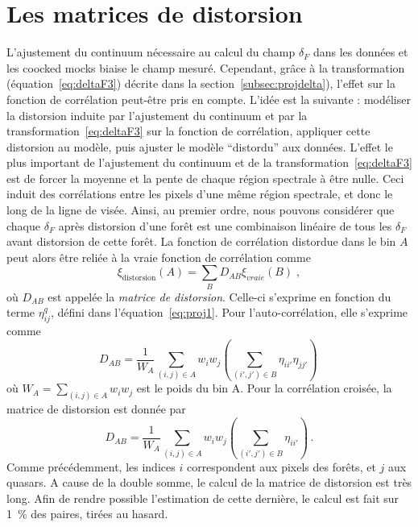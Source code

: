 \section{Les matrices de distorsion}
\label{sec:calcul_dmat}
L'ajustement du continuum nécessaire au calcul du champ $\delta_F$ dans les données et les coocked mocks biaise le champ mesuré. Cependant, grâce à la transformation (équation~\ref{eq:deltaF3}) décrite dans la section~\ref{subsec:projdelta}), l'effet sur la fonction de corrélation peut-être pris en compte.
L'idée est la suivante : modéliser la distorsion induite par l'ajustement du continuum et par la transformation~\ref{eq:deltaF3} sur la fonction de corrélation, appliquer cette distorsion au modèle, puis ajuster le modèle ``distordu'' aux données.
L'effet le plus important de l'ajustement du continuum et de la transformation~\ref{eq:deltaF3} est de forcer la moyenne et la pente de chaque région spectrale à être nulle. Ceci induit des corrélations entre les pixels d'une même région spectrale, et donc le long de la ligne de visée.
Ainsi, au premier ordre, nous pouvons considérer que chaque $\delta_F$ après distorsion d'une forêt est une combinaison linéaire de tous les $\delta_F$ avant distorsion de cette forêt.
La fonction de corrélation distordue dans le bin $A$ peut alors être reliée à la vraie fonction de corrélation comme
\begin{equation}
  \xi_{\mathrm{distorsion}}(A) = \sum_{B} D_{AB}\xi_{vraie}(B) \; , 
\end{equation}
où $D_{AB}$ est appelée la \emph{matrice de distorsion}. Celle-ci s'exprime en fonction du terme $\eta_{ij}^q$, défini dans l'équation~\ref{eq:proj1}. Pour l'auto-corrélation, elle s'exprime comme
\begin{equation}
  \label{eq:dmat}
  D_{AB} = \frac{1}{W_A} \sum_{(i,j)\in A} w_i w_j \left( \sum_{(i',j')\in B} \eta_{ii'} \eta_{jj'} \right) \,
\end{equation}
où $W_{A} = \sum_{(i,j)\in A} w_i w_j$ est le poids du bin A. Pour la corrélation croisée, la matrice de distorsion est donnée par
\begin{equation}
  \label{eq:xdmat}
  D_{AB} = \frac{1}{W_A} \sum_{(i,j)\in A} w_i w_j \left( \sum_{(i',j')\in B} \eta_{ii'} \right) \, .
\end{equation}
Comme précédemment, les indices $i$ correspondent aux pixels des forêts, et $j$ aux quasars. A cause de la double somme, le calcul de la matrice de distorsion est très long. Afin de rendre possible l'estimation de cette dernière, le calcul est fait sur \SI{1}{\percent} des paires, tirées au hasard.

